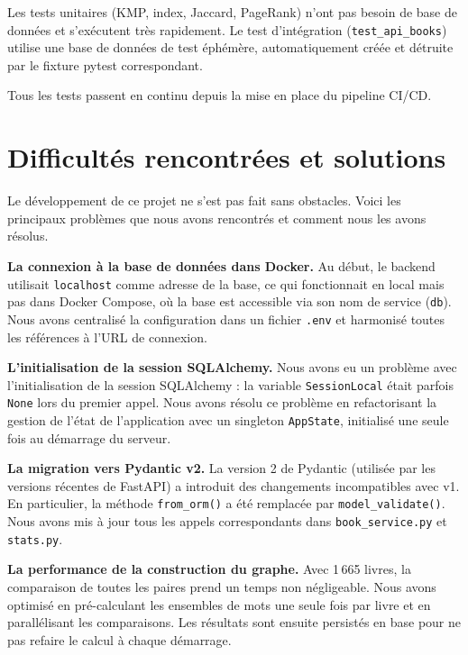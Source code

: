 \documentclass[12pt,a4paper]{article}
\begin{document}
Les tests unitaires (KMP, index, Jaccard, PageRank) n'ont pas besoin de base
de données et s'exécutent très rapidement. Le test d'intégration
(\texttt{test\_api\_books}) utilise une base de données de test éphémère,
automatiquement créée et détruite par le fixture pytest correspondant.

Tous les tests passent en continu depuis la mise en place du pipeline CI/CD.

\section{Difficultés rencontrées et solutions}

Le développement de ce projet ne s'est pas fait sans obstacles. Voici les
principaux problèmes que nous avons rencontrés et comment nous les avons résolus.

\textbf{La connexion à la base de données dans Docker.}
Au début, le backend utilisait \texttt{localhost} comme adresse de la base,
ce qui fonctionnait en local mais pas dans Docker Compose, où la base est
accessible via son nom de service (\texttt{db}). Nous avons centralisé la
configuration dans un fichier \texttt{.env} et harmonisé toutes les références
à l'URL de connexion.

\textbf{L'initialisation de la session SQLAlchemy.}
Nous avons eu un problème avec l'initialisation de la session SQLAlchemy :
la variable \texttt{SessionLocal} était parfois \texttt{None} lors du premier
appel. Nous avons résolu ce problème en refactorisant la gestion de l'état de
l'application avec un singleton \texttt{AppState}, initialisé une seule fois
au démarrage du serveur.

\textbf{La migration vers Pydantic v2.}
La version 2 de Pydantic (utilisée par les versions récentes de FastAPI) a
introduit des changements incompatibles avec v1. En particulier, la méthode
\texttt{from\_orm()} a été remplacée par \texttt{model\_validate()}.
Nous avons mis à jour tous les appels correspondants dans \texttt{book\_service.py}
et \texttt{stats.py}.

\textbf{La performance de la construction du graphe.}
Avec 1\,665 livres, la comparaison de toutes les paires prend un temps non
négligeable. Nous avons optimisé en pré-calculant les ensembles de mots
une seule fois par livre et en parallélisant les comparaisons. Les résultats
sont ensuite persistés en base pour ne pas refaire le calcul à chaque démarrage.
\end{document}

